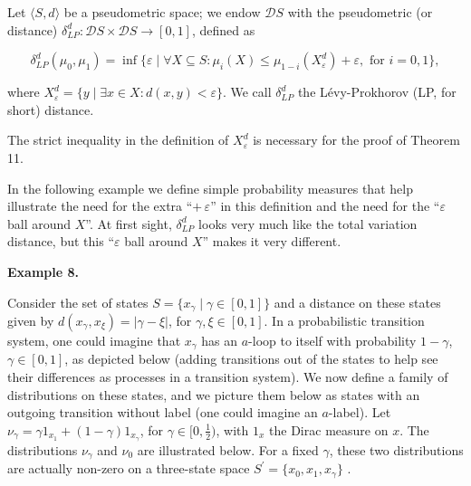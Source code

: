  
Let $\langle S,d\rangle$ be a pseudometric space; we endow $\mathcal{D}S$ with the pseudometric (or distance) $\delta^{d}_{LP}:\mathcal{D}S\times\mathcal{D}S\to[0,1]$, defined as\par
  
\par  \quad  \[\delta^{d}_{LP}(\mu_{0},\mu_{1})=\inf\{\varepsilon\mid\forall X\subseteq S:\mu_{i}(X)\leq\mu_{1-i}(X^{d}_{\varepsilon})+\varepsilon,\mbox{ for }i=0,1\},\]\quad  \quad  
  
where $X^{d}_{\varepsilon}=\{y\mid\exists x\in X:d(x,y)<\varepsilon\}$. We call $\delta^{d}_{LP}$ the Lévy-Prokhorov (LP, for short) distance.\par
 
 
 
 
The strict inequality in the definition of $X_{\varepsilon}^{d}$ is necessary for the proof of Theorem 11.\par
 
 
 
In the following example we define simple probability measures that help illustrate the need for the extra “$+\,\varepsilon$” in this definition and the need for the “$\varepsilon$ ball around $X$”. At first sight, $\delta^{d}_{LP}$ looks very much like the total variation distance, but this “$\varepsilon$ ball around $X$” makes it very different.\par
 
 
 
\par\medskip\noindent\textbf{Example 8.}\par
 
 
Consider the set of states $S=\{x_{\gamma}\mid\gamma\in[0,1]\}$ and a distance on these states given by $d(x_{\gamma},x_{\xi})=|\gamma-\xi|$, for $\gamma,\xi\in[0,1]$. In a probabilistic transition system, one could imagine that $x_{\gamma}$ has an $a$-loop to itself with probability $1-\gamma$, $\gamma\in[0,1]$, as depicted below (adding transitions out of the states to help see their differences as processes in a transition system). We now define a family of distributions on these states, and we picture them below as states with an outgoing transition without label (one could imagine an $a$-label). Let $\nu_{\gamma}=\gamma 1_{x_{1}}+(1-\gamma)1_{x_{\gamma}}$, for $\gamma\in[0,\frac{1}{2})$, with $1_{x}$ the Dirac measure on $x$. The distributions $\nu_{\gamma}$ and $\nu_{0}$ are illustrated below. For a fixed $\gamma$, these two distributions are actually non-zero on a three-state space $S^{\prime}=\{x_{0},x_{1},x_{\gamma}\}$ .\par
 
